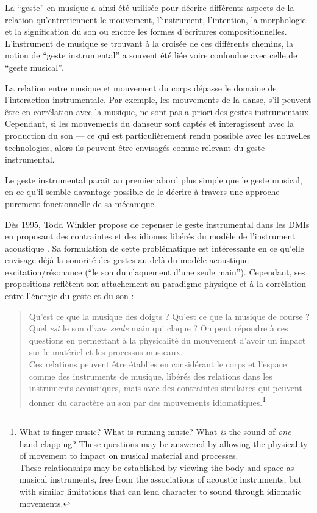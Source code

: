 La ``geste'' en musique a ainsi été utilisée pour décrire différents aspects de la relation qu'entretiennent le mouvement, l'instrument, l'intention, la morphologie et la signification du son ou encore les formes d'écritures compositionnelles. L'instrument de musique se trouvant à la croisée de ces différents chemins, la notion de ``geste instrumental'' a souvent été liée voire confondue avec celle de ``geste musical''. 

La relation entre musique et mouvement du corps dépasse le domaine de l'interaction instrumentale. Par exemple, les mouvements de la danse, s'il peuvent être en corrélation avec la musique, ne sont pas a priori des gestes instrumentaux. Cependant, si les mouvements du danseur sont captés et interagissent avec la production du son — ce qui est particulièrement rendu possible avec les nouvelles technologies, alors ils peuvent être envisagés comme relevant du geste instrumental.

Le geste instrumental parait au premier abord plus simple que le geste musical, en ce qu'il semble davantage possible de le décrire à travers une approche purement fonctionnelle de sa mécanique. 

Dès 1995, Todd Winkler propose de repenser le geste instrumental dans les \glspl{DMI} en proposant des contraintes et des idiomes libérés du modèle de l'instrument acoustique \cite{winkler_making_1995}. Sa formulation de cette problématique est intéressante en ce qu'elle envisage déjà la sonorité des gestes au delà du modèle acoustique excitation/résonance (``le son du claquement d'une seule main''). Cependant, ses propositions reflètent son attachement au paradigme physique et à la corrélation entre l'énergie du geste et du son :

\begin{quotation}
Qu'est ce que la musique des doigts ? Qu'est ce que la musique de course ? Quel \textit{est} le son d'\textit{une seule} main qui claque ? On peut répondre à ces questions en permettant à la physicalité du mouvement d'avoir un impact sur le matériel et les processus musicaux.\\
Ces relations peuvent être établies en considérant le corps et l'espace comme des instruments de musique, libérés des relations dans les instruments acoustiques, mais avec des contraintes similaires qui peuvent donner du caractère au son par des mouvements idiomatiques.\footnote{What is finger music? What is running music? What \textit{is} the sound of \textit{one} hand clapping? These questions may be answered by allowing the physicality of movement to impact on musical material and processes.\\
These relationships may be established by viewing the body and space as musical instruments, free from the associations of acoustic instruments, but with similar limitations that can lend character to sound through idiomatic movements.}
\end{quotation}




